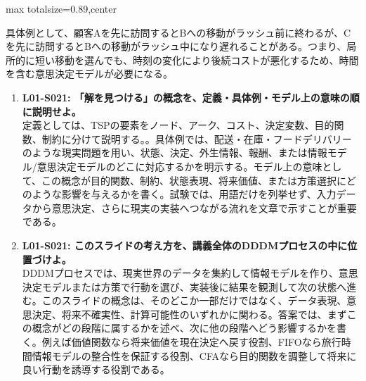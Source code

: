 \begin{minipage}[t]{0.58\textwidth}
\begin{adjustbox}{max totalsize={\textwidth}{0.89\textheight},center}
\begin{minipage}{\textwidth}
具体例として、顧客Aを先に訪問するとBへの移動がラッシュ前に終わるが、Cを先に訪問するとBへの移動がラッシュ中になり遅れることがある。つまり、局所的に短い移動を選んでも、時刻の変化により後続コストが悪化するため、時間を含む意思決定モデルが必要になる。\par{}\begin{enumerate}\item \textbf{L01-S021: 「解を見つける」の概念を、定義・具体例・モデル上の意味の順に説明せよ。}\\定義としては、TSPの要素をノード、アーク、コスト、決定変数、目的関数、制約に分けて説明する。。具体例では、配送・在庫・フードデリバリーのような現実問題を用い、状態、決定、外生情報、報酬、または情報モデル/意思決定モデルのどこに対応するかを明示する。モデル上の意味として、この概念が目的関数、制約、状態表現、将来価値、または方策選択にどのような影響を与えるかを書く。試験では、用語だけを列挙せず、入力データから意思決定、さらに現実の実装へつながる流れを文章で示すことが重要である。\item \textbf{L01-S021: このスライドの考え方を、講義全体のDDDMプロセスの中に位置づけよ。}\\DDDMプロセスでは、現実世界のデータを集約して情報モデルを作り、意思決定モデルまたは方策で行動を選び、実装後に結果を観測して次の状態へ進む。このスライドの概念は、そのどこか一部だけではなく、データ表現、意思決定、将来不確実性、計算可能性のいずれかに関わる。答案では、まずこの概念がどの段階に属するかを述べ、次に他の段階へどう影響するかを書く。例えば価値関数なら将来価値を現在決定へ戻す役割、FIFOなら旅行時間情報モデルの整合性を保証する役割、CFAなら目的関数を調整して将来に良い行動を誘導する役割である。\end{enumerate}
\end{minipage}
\end{adjustbox}
\end{minipage}


